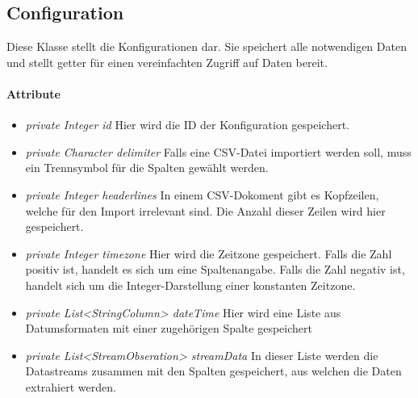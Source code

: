 
\subsection{Configuration}
Diese Klasse stellt die Konfigurationen dar. 
Sie speichert alle notwendigen Daten und stellt getter für einen vereinfachten Zugriff auf Daten bereit.

\paragraph{Attribute}

\begin{itemize}
	\item \textit{private Integer id} Hier wird die ID der Konfiguration gespeichert.
	
	\item \textit{private Character delimiter} Falls eine CSV-Datei importiert werden soll, muss ein Trennsymbol für die Spalten gewählt werden.
	
	\item \textit{private Integer headerlines} In einem CSV-Dokoment gibt es Kopfzeilen, welche für den Import irrelevant sind. Die Anzahl dieser Zeilen wird hier gespeichert.
	
	\item \textit{private Integer timezone} Hier wird die Zeitzone gespeichert. Falls die Zahl positiv ist, handelt es sich um eine Spaltenangabe. Falls die Zahl negativ ist, handelt sich um die Integer-Darstellung einer konstanten Zeitzone.
	
	\item \textit{private List<StringColumn> dateTime} Hier wird eine Liste aus Datumsformaten mit einer zugehörigen Spalte gespeichert 
	
	\item \textit{private List<StreamObseration> streamData} In dieser Liste werden die Datastreams zusammen mit den Spalten gespeichert, aus welchen die Daten extrahiert werden.
\end{itemize}

